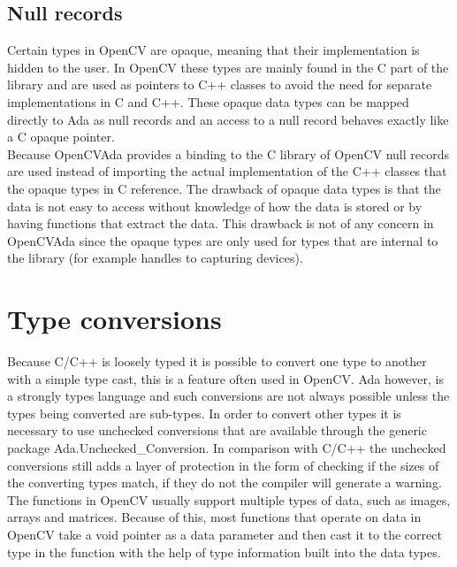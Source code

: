 \subsection{Null records}
Certain types in OpenCV are opaque, meaning that their implementation is hidden to the user. In OpenCV these types are mainly found in the C part of the library and are used as pointers to C++ classes to avoid the need for separate implementations in C and C++. These opaque data types can be mapped directly to Ada as null records and an access to a null record behaves exactly like a C opaque pointer.
\\
Because OpenCVAda provides a binding to the C library of OpenCV null records are used instead of importing the actual implementation of the C++ classes that the opaque types in C reference.
The drawback of opaque data types is that the data is not easy to access without knowledge of how the data is stored or by having functions that extract the data. This drawback is not of any concern in OpenCVAda since the opaque types are only used for types that are internal to the library (for example handles to capturing devices).
\section{Type conversions}\label{sec:typeconv}
Because C/C++ is loosely typed it is possible to convert one type to another with a simple type cast, this is a feature often used in OpenCV. Ada however, is a strongly types language and such conversions are not always possible unless the types being converted are sub-types. In order to convert other types it is necessary to use unchecked conversions that are available through the generic package Ada.Unchecked_Conversion. In comparison with C/C++ the unchecked conversions still adds a layer of protection in the form of checking if the sizes of the converting types match, if they do not the compiler will generate a warning.
\\
The functions in OpenCV usually support multiple types of data, such as images, arrays and matrices. Because of this, most functions that operate on data in OpenCV take a void pointer as a data parameter and then cast it to the correct type in the function with the help of type information built into the data types.
